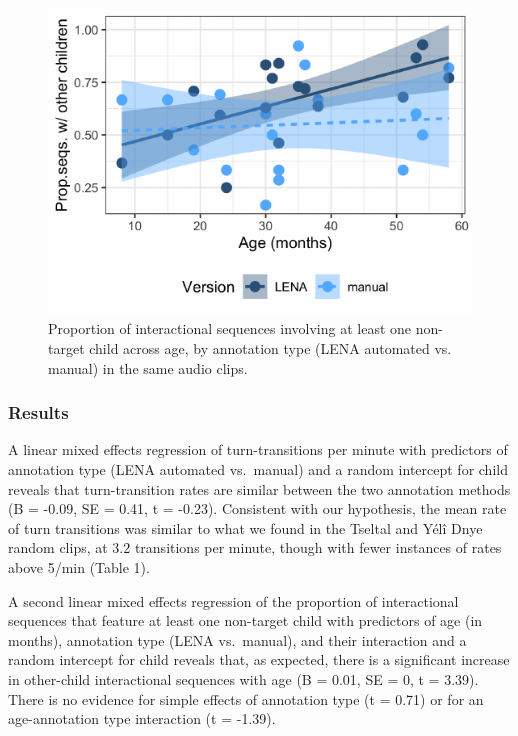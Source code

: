 \documentclass[10pt, letterpaper]{article}
\newenvironment{CodeChunk}{}{}
\begin{document}
\begin{CodeChunk}
\begin{figure}[h]

{\centering \includegraphics{figs/tsi.is.fig-1} 

}

\caption[Proportion of interactional sequences involving at least one non-target child across age, by annotation type (LENA automated vs]{Proportion of interactional sequences involving at least one non-target child across age, by annotation type (LENA automated vs. manual) in the same audio clips.}\label{fig:tsi.is.fig}
\end{figure}
\end{CodeChunk}

\hypertarget{results-1}{%
\subsubsection{Results}\label{results-1}}

A linear mixed effects regression of turn-transitions per minute with
predictors of annotation type (LENA automated vs.~manual) and a random
intercept for child reveals that turn-transition rates are similar
between the two annotation methods (B = -0.09, SE = 0.41, t = -0.23).
Consistent with our hypothesis, the mean rate of turn transitions was
similar to what we found in the Tseltal and Yélî Dnye random clips, at
3.2 transitions per minute, though with fewer instances of rates above
5/min (Table 1).

A second linear mixed effects regression of the proportion of
interactional sequences that feature at least one non-target child with
predictors of age (in months), annotation type (LENA vs.~manual), and
their interaction and a random intercept for child reveals that, as
expected, there is a significant increase in other-child interactional
sequences with age (B = 0.01, SE = 0, t = 3.39). There is no evidence
for simple effects of annotation type (t = 0.71) or for an
age-annotation type interaction (t = -1.39).
\end{document}
